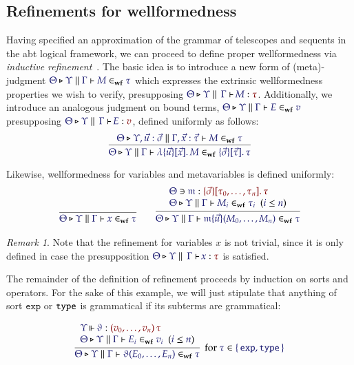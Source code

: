 \documentclass[11pt]{article}
\theoremstyle{definition}
\theoremstyle{remark}
\newtheorem{remark}[thm]{Remark}
\numberwithin{equation}{section}
\newcommand\SortExp{\mathtt{exp}}
\newcommand\IsWf[5]{%
  \IMode{#1}\triangleright%
  \IMode{#2}\parallel%
  \IMode{#3}\vdash%
  \IMode{#4}\in_{\mathbf{wf}}\IMode{#5}%
}
\begin{document}
\subsection{Refinements for wellformedness}

Having specified an approximation of the grammar of telescopes and sequents in
the abt logical framework, we can proceed to define proper wellformedness via
\emph{inductive refinement}~\cite{harper:2016}. The basic idea is to introduce a
new form of (meta)-judgment $\IsWf{\Theta}{\Upsilon}{\Gamma}{M}{\tau}$ which
expresses the extrinsic wellformedness properties we wish to verify,
presupposing $\IsAbt{\Theta}{\Upsilon}{\Gamma}{M}{\tau}$. Additionally, we
introduce an analogous judgment on bound terms,
$\IsWf{\Theta}{\Upsilon}{\Gamma}{E}{v}$ presupposing
$\IsAbt{\Theta}{\Upsilon}{\Gamma}{E}{v}$, defined uniformly as follows:
\[
  \infer{
    \IsWf{\Theta}{\Upsilon}{\Gamma}{
      \MkBTm{\vec{u}}{\vec{x}}{M}
    }{
      \MkValence{\vec{\sigma}}{\vec{\tau}}{\tau}
    }
  }{
    \IsWf{\Theta}{\Upsilon,\vec{u}:\vec{\sigma}}{\Gamma,\vec{x}:\vec{\tau}}{M}{\tau}
  }
\]

Likewise, wellformedness for variables and metavariables is defined uniformly:
\begin{gather*}
  \infer{
    \IsWf{\Theta}{\Upsilon}{\Gamma}{x}{\tau}
  }{
  }
\qquad
  \infer{
    \IsWf{\Theta}{\Upsilon}{\Gamma}{
      \MApp{\MV{m}}{\vec{u}}{M_0,\dots,M_n}
    }{\tau}
  }{
    \begin{array}{l}
      \Lookup{\Theta}{\MV{m}}{\MkValence{\vec{\sigma}}{\tau_0,\dots,\tau_n}{\tau}}
\\
      \HypJ{
        \IsWf{\Theta}{\Upsilon}{\Gamma}{M_i}{\tau_i}
      }{
        \Leq{i}{n}
      }
    \end{array}
  }
\end{gather*}

\begin{remark}
  Note that the refinement for variables $x$ is not trivial, since it is only
  defined in case the presupposition $\IsAbt{\Theta}{\Upsilon}{\Gamma}{x}{\tau}$
  is satisfied.
\end{remark}

The remainder of the definition of refinement proceeds by induction on sorts and
operators. For the sake of this example, we will just stipulate that anything of
sort $\SortExp$ or $\mathtt{type}$ is grammatical if its subterms are grammatical:

\[
  \infer[
    \text{for $\Member{\tau}{\MkSet{\SortExp,\SortType}}$}
  ]{
    \IsWf{\Theta}{\Upsilon}{\Gamma}{
      \App{\vartheta}{E_0,\dots,E_n}
    }{\tau}
  }{
    \begin{array}{l}
      \IsOperator{\Upsilon}{\vartheta}{
        \MkArity{
          v_0,\dots,v_n
        }{\tau}
      }
\\
      \HypJ{
        \IsWf{\Theta}{\Upsilon}{\Gamma}{E_i}{v_i}
      }{
        \Leq{i}{n}
      }
    \end{array}
  }
\]
\end{document}

